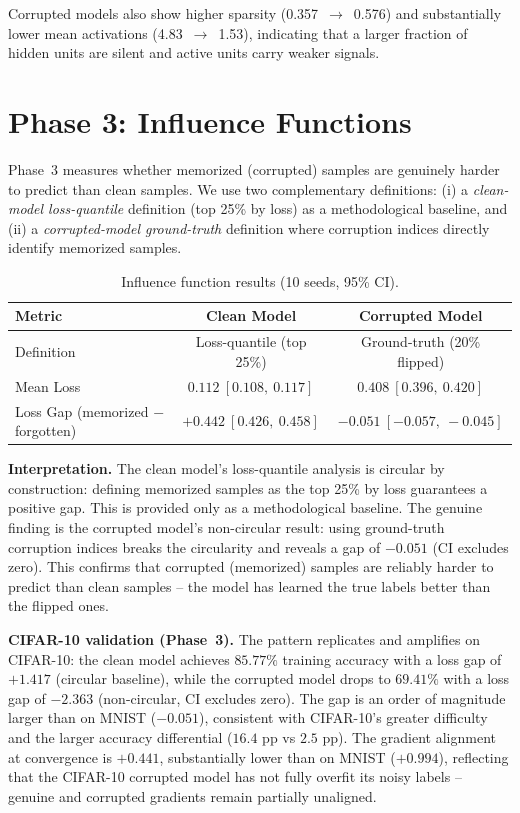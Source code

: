 \documentclass{article}
\begin{document}
Corrupted models also show higher sparsity (0.357~$\to$~0.576) and substantially lower mean activations (4.83~$\to$~1.53), indicating that a larger fraction of hidden units are silent and active units carry weaker signals.

\section{Phase 3: Influence Functions}
\label{sec:phase3}

Phase~3 measures whether memorized (corrupted) samples are genuinely harder to predict than clean samples. We use two complementary definitions: (i) a \emph{clean-model loss-quantile} definition (top 25\% by loss) as a methodological baseline, and (ii) a \emph{corrupted-model ground-truth} definition where corruption indices directly identify memorized samples.

\begin{table}[t]
  \centering
  \caption{Influence function results (10 seeds, 95\% CI).}
  \label{tab:phase3}
  \begin{tabular}{lcc}
    \toprule
    Metric & Clean Model & Corrupted Model \\
    \midrule
    Definition & Loss-quantile (top 25\%) & Ground-truth (20\% flipped) \\
    Mean Loss & $0.112\ [0.108,\ 0.117]$ & $0.408\ [0.396,\ 0.420]$ \\
    Loss Gap (memorized $-$ forgotten) & $+0.442\ [0.426,\ 0.458]$ & $\mathbf{-0.051\ [-0.057,\ -0.045]}$ \\
    \bottomrule
  \end{tabular}
\end{table}

\textbf{Interpretation.} The clean model's loss-quantile analysis is circular by construction: defining memorized samples as the top 25\% by loss guarantees a positive gap. This is provided only as a methodological baseline. The genuine finding is the corrupted model's non-circular result: using ground-truth corruption indices breaks the circularity and reveals a gap of $-0.051$ (CI excludes zero). This confirms that corrupted (memorized) samples are reliably harder to predict than clean samples -- the model has learned the true labels better than the flipped ones.

\textbf{CIFAR-10 validation (Phase~3).} The pattern replicates and amplifies on CIFAR-10: the clean model achieves $85.77\%$ training accuracy with a loss gap of $+1.417$ (circular baseline), while the corrupted model drops to $69.41\%$ with a loss gap of $-2.363$ (non-circular, CI excludes zero). The gap is an order of magnitude larger than on MNIST ($-0.051$), consistent with CIFAR-10's greater difficulty and the larger accuracy differential ($16.4$ pp vs $2.5$ pp). The gradient alignment at convergence is $+0.441$, substantially lower than on MNIST ($+0.994$), reflecting that the CIFAR-10 corrupted model has not fully overfit its noisy labels -- genuine and corrupted gradients remain partially unaligned.
\end{document}
